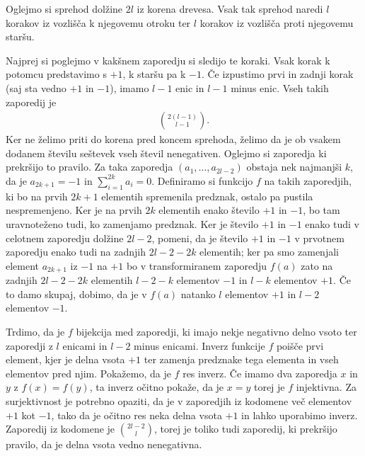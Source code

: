 \begin{dokaz}
    Oglejmo si sprehod dolžine \(2l\) iz korena drevesa. Vsak tak sprehod naredi \(l\) korakov iz vozlišča k njegovemu otroku ter \(l\) korakov iz vozlišča proti njegovemu staršu. 
    
    Najprej si poglejmo v kakšnem zaporedju si sledijo te koraki. Vsak korak k potomcu predstavimo s \(+1\), k staršu pa k \(-1\). Če izpustimo prvi in zadnji korak (saj sta vedno \(+1\) in \(-1\)), imamo \(l-1\) enic in \(l-1\) minus enic. Vseh takih zaporedij je
    \begin{align*}
        \binom{2(l-1)}{l-1}.
    \end{align*}
    Ker ne želimo priti do korena pred koncem sprehoda, želimo da je ob vsakem dodanem številu seštevek vseh števil nenegativen. Oglejmo si zaporedja ki prekršijo to pravilo. Za taka zaporedja \((a_1, \ldots, a_{2l-2})\) obstaja nek najmanjši \(k\), da je \(a_{2k+1}=-1\) in \(\sum_{i=1}^{2k} a_i = 0\). Definiramo si funkcijo \(f\) na takih zaporedjih, ki bo na prvih \(2k+1\) elementih spremenila predznak, ostalo pa pustila nespremenjeno. Ker je na prvih \(2k\) elementih enako število \(+1\) in \(-1\), bo tam uravnoteženo tudi, ko zamenjamo predznak. Ker je število \(+1\) in \(-1\) enako tudi v celotnem zaporedju dolžine \(2l-2\), pomeni, da je število \(+1\) in \(-1\) v prvotnem zaporedju enako tudi na zadnjih \(2l-2-2k\) elementih; ker pa smo zamenjali element \(a_{2k+1}\) iz \(-1\) na \(+1\) bo v transformiranem zaporedju \(f(a)\) zato na zadnjih \(2l-2-2k\) elementih \(l-2-k\) elementov \(-1\) in \(l-k\) elementov \(+1\). Če to damo skupaj, dobimo, da je v \(f(a)\) natanko \(l\) elementov \(+1\) in \(l-2\) elementov \(-1\). 
    
    Trdimo, da je \(f\) bijekcija med zaporedji, ki imajo nekje negativno delno vsoto ter zaporedji z \(l\) enicami in \(l-2\) minus enicami. Inverz funkcije \(f\) poišče prvi element, kjer je delna vsota \(+1\) ter zamenja predznake tega elementa in vseh elementov pred njim. Pokažemo, da je \(f\) res inverz. Če imamo dva zaporedja \(x\) in \(y\) z \(f(x)=f(y)\), ta inverz očitno pokaže, da je \(x=y\) torej je \(f\) injektivna. Za surjektivnost je potrebno opaziti, da je v zaporedjih iz kodomene več elementov \(+1\) kot \(-1\), tako da je očitno res neka delna vsota \(+1\) in lahko uporabimo inverz. Zaporedij iz kodomene je \(\binom{2l-2}{l}\), torej je toliko tudi zaporedij, ki prekršijo pravilo, da je delna vsota vedno nenegativna.
    

\end{dokaz}
